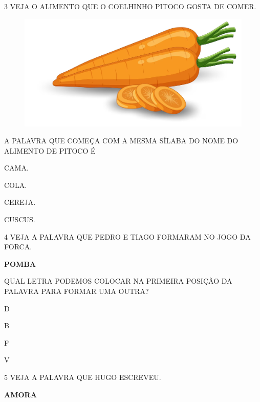 \num{3} VEJA O ALIMENTO QUE O COELHINHO PITOCO GOSTA DE COMER.

\begin{figure}[H]
\centering
\includegraphics[width=\textwidth]{./media/image223.png}
\end{figure}

A PALAVRA QUE COMEÇA COM A MESMA SÍLABA DO NOME DO ALIMENTO DE PITOCO É

\begin{escolha}
\item CAMA.

\item COLA.

\item CEREJA.

\item CUSCUS.

\end{escolha}

\num{4} VEJA A PALAVRA QUE PEDRO E TIAGO FORMARAM NO JOGO DA FORCA.

\begin{center}
\textbf{POMBA}
\end{center}

QUAL LETRA PODEMOS COLOCAR NA PRIMEIRA POSIÇÃO DA PALAVRA PARA FORMAR UMA OUTRA?

\begin{escolha}
\item D

\item B

\item F

\item V

\end{escolha}

\num{5} VEJA A PALAVRA QUE HUGO ESCREVEU.

\begin{center}
\textbf{AMORA}
\end{center}

